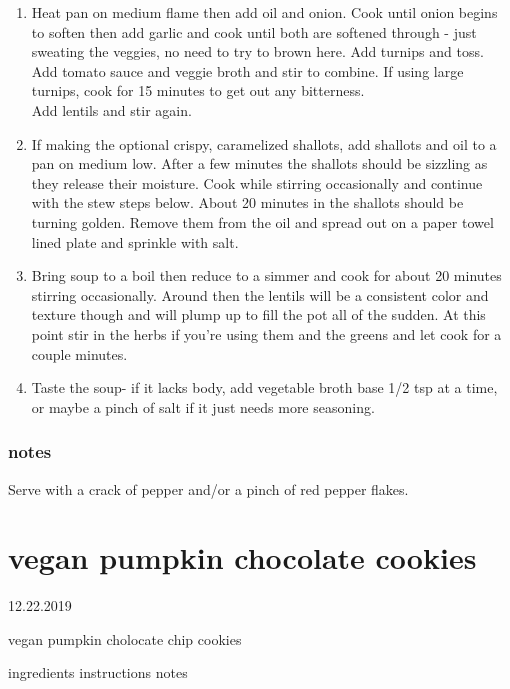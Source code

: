 \documentclass[]{book}
\providecommand{\tightlist}{%
  \setlength{\itemsep}{0pt}\setlength{\parskip}{0pt}}
\begin{document}
\begin{enumerate}
\def\labelenumi{\arabic{enumi}.}
\tightlist
\item
  Heat pan on medium flame then add oil and onion. Cook until onion begins to soften then add garlic and cook until
  both are softened through - just sweating the veggies, no need to try to brown here. Add turnips and toss. Add tomato
  sauce and veggie broth and stir to combine. If using large turnips, cook for 15 minutes to get out any bitterness.\\
  Add lentils and stir again.
\item
  If making the optional crispy, caramelized shallots, add shallots and oil to a pan on medium low. After a few
  minutes the shallots should be sizzling as they release their moisture. Cook while stirring occasionally and continue
  with the stew steps below. About 20 minutes in the shallots should be turning golden. Remove them from the oil and
  spread out on a paper towel lined plate and sprinkle with salt.
\item
  Bring soup to a boil then reduce to a simmer and cook for about 20 minutes stirring occasionally. Around then the
  lentils will be a consistent color and texture though and will plump up to fill the pot all of the sudden. At this
  point stir in the herbs if you're using them and the greens and let cook for a couple minutes.
\item
  Taste the soup- if it lacks body, add vegetable broth base 1/2 tsp at a time, or maybe a pinch of salt if it just
  needs more seasoning.
\end{enumerate}

\hypertarget{notes-20}{%
\subsection{notes}\label{notes-20}}

Serve with a crack of pepper and/or a pinch of red pepper flakes.

\hypertarget{vegan-pumpkin-chocolate-cookies}{%
\chapter{vegan pumpkin chocolate cookies}\label{vegan-pumpkin-chocolate-cookies}}

12.22.2019

vegan pumpkin cholocate chip cookies

ingredients \textbar{}
instructions \textbar{}
notes
\end{document}
